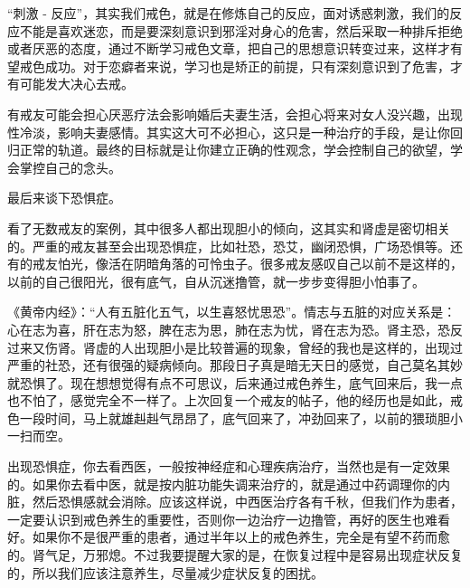 \documentclass[fontset=founder]{ctexart}
\begin{document}
“刺激 - 反应”，其实我们戒色，就是在修炼自己的反应，面对诱惑刺激，我们的反应不能是喜欢迷恋，而是要深刻意识到邪淫对身心的危害，然后采取一种排斥拒绝或者厌恶的态度，通过不断学习戒色文章，把自己的思想意识转变过来，这样才有望戒色成功。对于恋癖者来说，学习也是矫正的前提，只有深刻意识到了危害，才有可能发大决心去戒。

有戒友可能会担心厌恶疗法会影响婚后夫妻生活，会担心将来对女人没兴趣，出现性冷淡，影响夫妻感情。其实这大可不必担心，这只是一种治疗的手段，是让你回归正常的轨道。最终的目标就是让你建立正确的性观念，学会控制自己的欲望，学会掌控自己的念头。

最后来谈下恐惧症。

看了无数戒友的案例，其中很多人都出现胆小的倾向，这其实和肾虚是密切相关的。严重的戒友甚至会出现恐惧症，比如社恐，恐艾，幽闭恐惧，广场恐惧等。还有的戒友怕光，像活在阴暗角落的可怜虫子。很多戒友感叹自己以前不是这样的，以前的自己很阳光，很有底气，自从沉迷撸管，就一步步变得胆小怕事了。

《黄帝内经》：“人有五脏化五气，以生喜怒忧思恐”。情志与五脏的对应关系是：心在志为喜，肝在志为怒，脾在志为思，肺在志为忧，肾在志为恐。肾主恐，恐反过来又伤肾。肾虚的人出现胆小是比较普遍的现象，曾经的我也是这样的，出现过严重的社恐，还有很强的疑病倾向。那段日子真是暗无天日的感觉，自己莫名其妙就恐惧了。现在想想觉得有点不可思议，后来通过戒色养生，底气回来后，我一点也不怕了，感觉完全不一样了。上次回复一个戒友的帖子，他的经历也是如此，戒色一段时间，马上就雄赳赳气昂昂了，底气回来了，冲劲回来了，以前的猥琐胆小一扫而空。

出现恐惧症，你去看西医，一般按神经症和心理疾病治疗，当然也是有一定效果的。如果你去看中医，就是按内脏功能失调来治疗的，就是通过中药调理你的内脏，然后恐惧感就会消除。应该这样说，中西医治疗各有千秋，但我们作为患者，一定要认识到戒色养生的重要性，否则你一边治疗一边撸管，再好的医生也难看好。如果你不是很严重的患者，通过半年以上的戒色养生，完全是有望不药而愈的。肾气足，万邪熄。不过我要提醒大家的是，在恢复过程中是容易出现症状反复的，所以我们应该注意养生，尽量减少症状反复的困扰。
\end{document}
